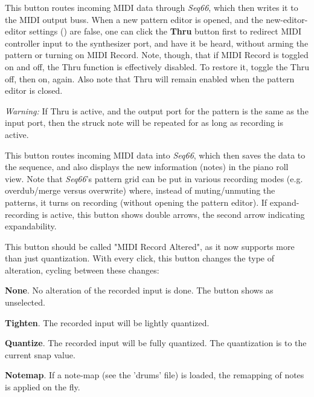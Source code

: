    This button routes incoming MIDI data through
   \textsl{Seq66}, which then writes it to the MIDI output buss.
   When a new pattern editor is opened,
   and the new-editor-editor settings
   ()
   are false, one can click the
   \textbf{Thru} button first to redirect MIDI controller input
   to the synthesizer port, and have it be heard, without
   arming the pattern or turning on MIDI Record.
   Note, though, that if MIDI Record is toggled on and off, the
   Thru function is effectively disabled.  To restore it,
   toggle the Thru off, then on, again.
   Also note that Thru will remain enabled when the pattern editor is closed.

   \textsl{Warning:}
   If Thru is active, and the output port for the pattern is the
   same as the input port, then the struck note will be repeated
   for as long as recording is active.

   This button routes incoming MIDI data into
   \textsl{Seq66}, which then saves the data to the sequence, and also
   displays the new information (notes) in the piano roll view.
   Note that \textsl{Seq66}'s pattern grid can be put in various recording
   modes (e.g. overdub/merge versus overwrite) where, instead of
   muting/unmuting the patterns, it turns on recording (without opening the
   pattern editor).
   If expand-recording is active, this button shows double arrows, the
   second arrow indicating expandability.

   This button should be called "MIDI Record Altered", as it now supports
   more than just quantization.
   With every click, this button changes the type of alteration, cycling
   between these changes:

   \begin{enumber}
      \item \textbf{None}.
         No alteration of the recorded input is done.
         The button shows as unselected.
      \item \textbf{Tighten}.
         The recorded input will be lightly quantized.
      \item \textbf{Quantize}.
         The recorded input will be fully quantized.
         The quantization is to the current snap value.
      \item \textbf{Notemap}.
         If a note-map (see the 'drums' file) is loaded, the remapping of notes
         is applied on the fly.
   \end{enumber}

